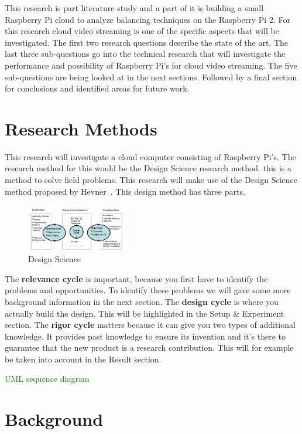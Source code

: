 \documentclass{sig-alternate-br}
\newcommand\todo[1]{
	\textcolor{green}{#1}
}
\begin{document}
This research is part literature study and a part of it is building a small Raspberry Pi cloud to analyze balancing techniques on the Raspberry Pi 2. For this research cloud video streaming is one of the specific aspects that will be investigated. The first two research questions describe the state of the art. The last three sub-questions go into the technical research that will investigate the performance and possibility of Raspberry Pi's for cloud video streaming. The five sub-questions are being looked at in the next sections. Followed by a final section for conclusions and identified areas for future work.

\section{Research Methods}
This research will investigate a cloud computer consisting of Raspberry Pi's. The research method for this would be the Design Science research method. this is a method to solve field problems. This research will make use of the Design Science method proposed by Hevner~\cite{hevner:2007}. This design method has three parts. 
\begin{figure}[H]
	\centering 
	\includegraphics[width=0.4\textwidth]{Design_science.png}
	\caption{Design Science}
	\label{fig:design} %
\end{figure}
The \textbf{relevance cycle} is important, because you first have to identify the problems and opportunities. To identify these problems we will gave some more background information in the next section. The \textbf{design cycle} is where you actually build the design. This will be highlighted in the Setup \& Experiment section. The \textbf{rigor cycle} matters because it can give you two types of additional knowledge. It provides past knowledge to ensure its invention and it's there to guarantee that the new product is a research contribution. This will for example be taken into account in the Result section. 

\todo{UML sequence diagram}

\section{Background}
\end{document}
